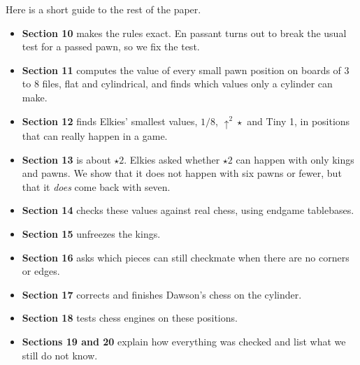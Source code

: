 \indent Here is a short guide to the rest of the paper.
\begin{itemize}
\item \textbf{Section 10} makes the rules exact. En passant turns out to break the usual test for a passed pawn,
  so we fix the test.
\item \textbf{Section 11} computes the value of every small pawn position on boards of 3 to 8 files, flat and
  cylindrical, and finds which values only a cylinder can make.
\item \textbf{Section 12} finds Elkies' smallest values, $1/8$, $\uparrow^{2}\star$ and Tiny 1, in positions
  that can really happen in a game.
\item \textbf{Section 13} is about $\star2$. Elkies asked whether $\star2$ can happen with only kings and pawns.
  We show that it does not happen with six pawns or fewer, but that it \emph{does} come back with seven.
\item \textbf{Section 14} checks these values against real chess, using endgame tablebases.
\item \textbf{Section 15} unfreezes the kings.
\item \textbf{Section 16} asks which pieces can still checkmate when there are no corners or edges.
\item \textbf{Section 17} corrects and finishes Dawson's chess on the cylinder.
\item \textbf{Section 18} tests chess engines on these positions.
\item \textbf{Sections 19 and 20} explain how everything was checked and list what we still do not know.
\end{itemize}
